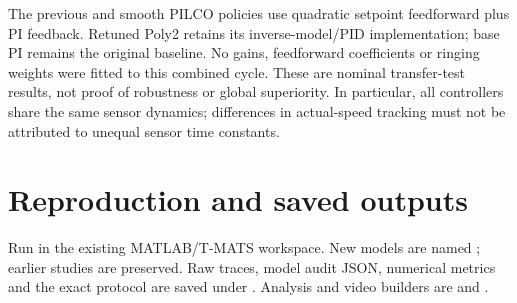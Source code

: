 The previous and smooth PILCO policies use quadratic setpoint feedforward plus PI feedback. Retuned Poly2 retains its inverse-model/PID implementation; base PI remains the original baseline. No gains, feedforward coefficients or ringing weights were fitted to this combined cycle. These are nominal transfer-test results, not proof of robustness or global superiority. In particular, all controllers share the same sensor dynamics; differences in actual-speed tracking must not be attributed to unequal sensor time constants.
\section{Reproduction and saved outputs}
Run  in the existing MATLAB/T-MATS workspace. New models are named ; earlier studies are preserved. Raw traces, model audit JSON, numerical metrics and the exact protocol are saved under . Analysis and video builders are  and .
